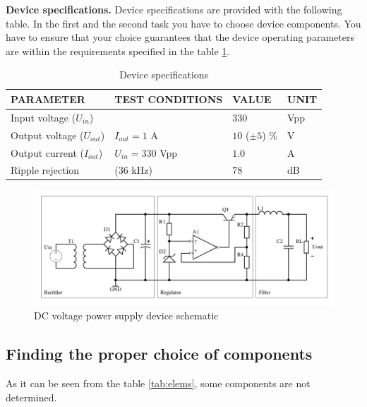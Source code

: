\documentclass{article}
\begin{document}
\textbf{Device specifications.} Device specifications are provided with 
the following table. In the first and the second task you have to choose device 
components. You have to ensure that your choice guarantees that the 
device operating parameters are within the requirements specified in the 
table \ref{tab:spec}.

\begin{table}[h!]
	\caption{Device specifications}
	\label{tab:spec}
	\begin{tabularx}{\linewidth}{|X|X|X|X|} \hline
		PARAMETER & TEST CONDITIONS & VALUE & UNIT \\ \hline
		Input voltage ($U_{in}$)&  & $330$ & Vpp \\ \hline 
		Output voltage ($U_{out}$)& $I_{out} = 1$ A & $10$ ($\pm5$) \% & V \\ 
		\hline
		Output current ($I_{out}$) & $U_{in} = 330$ Vpp & $1.0$ & A \\ \hline
		Ripple rejection & (36 kHz) & $78$ & dB \\ \hline
	\end{tabularx}
\end{table}

\begin{figure}
	\centering
	\includegraphics[width=\linewidth]{reg.png}
	\caption{DC voltage power supply device schematic}
	\label{fig:schematic}
\end{figure}

\clearpage

\subsection{Finding the proper choice of components}
\label{ele:task:1}
As it can be seen from the table \ref{tab:elems}, some components are not 
determined. 
\end{document}

